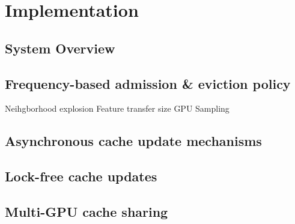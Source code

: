 \chapter{Implementation}

\section{System Overview}

\section{Frequency-based admission \& eviction policy}
Neihgborhood explosion
Feature transfer size
GPU Sampling


\section{Asynchronous cache update mechanisms}


\section{Lock-free cache updates}


\section{Multi-GPU cache sharing}

